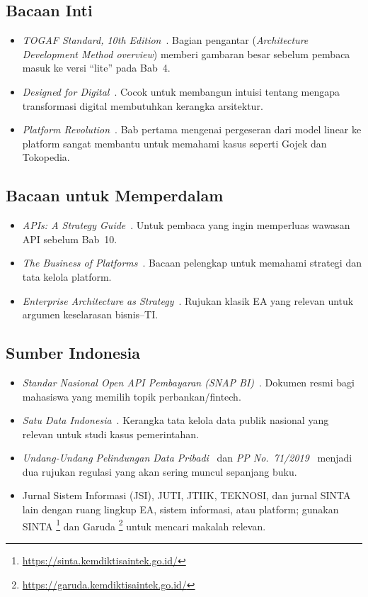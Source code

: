 \subsection*{Bacaan Inti}

\begin{itemize}
  \item \emph{TOGAF Standard, 10th Edition}~\cite{togaf10}. Bagian pengantar
        (\emph{Architecture Development Method overview}) memberi gambaran
        besar sebelum pembaca masuk ke versi ``lite'' pada Bab~4.
  \item \emph{Designed for Digital}~\cite{ross2019designed}. Cocok untuk
        membangun intuisi tentang mengapa transformasi digital membutuhkan kerangka
        arsitektur.
  \item \emph{Platform Revolution}~\cite{parker2016platform}. Bab pertama
        mengenai pergeseran dari model linear ke platform sangat membantu
        untuk memahami kasus seperti Gojek dan Tokopedia.
\end{itemize}

\subsection*{Bacaan untuk Memperdalam}

\begin{itemize}
  \item \emph{APIs: A Strategy Guide}~\cite{jacobson2011apis}. Untuk pembaca
        yang ingin memperluas wawasan API sebelum Bab~10.
  \item \emph{The Business of Platforms}~\cite{cusumano2019business}.
        Bacaan pelengkap untuk memahami strategi dan tata kelola platform.
  \item \emph{Enterprise Architecture as Strategy}~\cite{ross2006enterprise}.
        Rujukan klasik EA yang relevan untuk argumen keselarasan bisnis--TI.
\end{itemize}

\subsection*{Sumber Indonesia}

\begin{itemize}
  \item \emph{Standar Nasional Open API Pembayaran (SNAP BI)}~\cite{snapbi}.
        Dokumen resmi bagi mahasiswa yang memilih topik perbankan/fintech.
  \item \emph{Satu Data Indonesia}~\cite{satudata}. Kerangka tata kelola data
        publik nasional yang relevan untuk studi kasus pemerintahan.
  \item \emph{Undang-Undang Pelindungan Data Pribadi}~\cite{uupdp2022} dan
        \emph{PP No.~71/2019}~\cite{pp712019} menjadi dua rujukan regulasi
        yang akan sering muncul sepanjang buku.
  \item Jurnal Sistem Informasi (JSI), JUTI, JTIIK, TEKNOSI, dan jurnal SINTA
        lain dengan ruang lingkup EA, sistem informasi, atau platform; gunakan SINTA
        \footnote{\url{https://sinta.kemdiktisaintek.go.id/}} dan Garuda
        \footnote{\url{https://garuda.kemdiktisaintek.go.id/}} untuk mencari
        makalah relevan.
\end{itemize}
